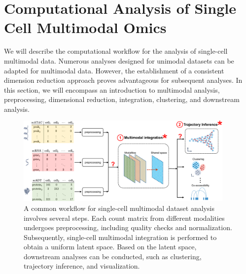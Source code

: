 \section{Computational Analysis of Single Cell Multimodal Omics}
\label{background:multimodal}
We will describe the computational workflow for the analysis of single-cell multimodal data. Numerous analyses designed for unimodal datasets can be adapted for multimodal data. However, the establishment of a consistent dimension reduction approach proves advantageous for subsequent analyses. In this section, we will encompass an introduction to multimodal analysis,  preprocessing, dimensional reduction, integration, clustering, and downstream analysis.

\begin{figure}[!ht]
	\centering
	\includegraphics[width=0.95\textwidth]{workflow_multimodal/fig}
	\vspace{0.1cm}
	\caption[A common computational multimodal analysis workflow.]{A common workflow for single-cell multimodal dataset analysis involves several steps. Each count matrix from different modalities undergoes preprocessing, including quality checks and normalization. Subsequently, single-cell multimodal integration is performed to obtain a uniform latent space. Based on the latent space, downstream analyses can be conducted, such as clustering, trajectory inference, and visualization.}
	\label{fig:workflow_multimodal}
\end{figure}

